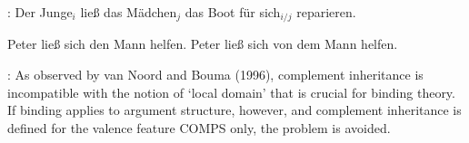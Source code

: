 \documentclass[output=paper
	        ,collection
	        ,collectionchapter
 	        ,biblatex
                ,babelshorthands
                ,newtxmath
                ,draftmode
                ,colorlinks, citecolor=brown
]{langscibook}
\begin{document}
{\citet[]{Kiss95a}:
\ea
Der Junge$_i$ ließ das Mädchen$_j$ das Boot für sich$_{i/j}$ reparieren.
\z

\eal
\ex Peter ließ sich den Mann helfen.
\ex Peter ließ sich von dem Mann helfen.
\zl

\citet{NB97a}


\citet[]{BMS2001a}:
As observed by van Noord and Bouma (1996), complement inheritance is incompatible with the notion of ‘local domain’ that is crucial for binding theory. If binding applies to argument structure, however, and complement inheritance is defined for the valence feature COMPS only, the problem is avoided.

}





\end{document}
